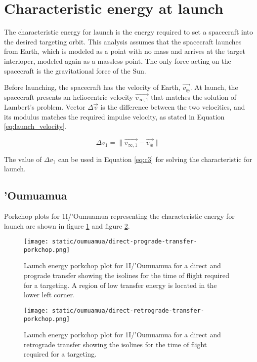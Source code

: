 \section{Characteristic energy at launch}

The characteristic energy for launch is the energy required to set a spacecraft
into the desired targeting orbit. This analysis assumes that the spacecraft
launches from Earth, which is modeled as a point with no mass and arrives at the
target interloper, modeled again as a massless point. The only force acting on
the spacecraft is the gravitational force of the Sun.

Before launching, the spacecraft has the velocity of Earth, $\vec{v_{\oplus}}$.
At launch, the spacecraft presents an heliocentric velocity $\vec{v_{\infty
,1}}$ that matches the solution of Lambert's problem. Vector $\Delta{\vec{v}}$
is the difference between the two velocities, and its modulus matches the
required impulse velocity, as stated in Equation \ref{eq:launch_velocity}.

\begin{equation}
    \Delta v_1 = \|\vec{v_{\infty ,1}} - \vec{v_{\oplus}}\|
    \label{eq:launch_velocity}
\end{equation}

The value of $\Delta v_1$ can be used in Equation \ref{eq:c3} for solving the
characteristic for launch.

\subsection{'Oumuamua}

Porkchop plots for 1I/'Oumuamua representing the characteristic energy for launch
are shown in figure \ref{fig:oumuamua-direct-prograde-transfer-porkchop} and
figure \ref{fig:oumuamua-direct-retrograde-transfer-porkchop}.

\begin{figure}[H]
  \centering
  \texttt{[image: static/oumuamua/direct-prograde-transfer-porkchop.png]}
        \caption[Direct and prograde launch energy porkchop for 'Oumuamua]{Launch energy porkchop plot for 1I/'Oumuamua for a direct and prograde
        transfer showing the isolines for
        the time of flight required for a targeting. A region of low transfer
        energy is located in the lower left corner.}
  \label{fig:oumuamua-direct-prograde-transfer-porkchop}
\end{figure}

\begin{figure}[H]
  \centering
  \texttt{[image: static/oumuamua/direct-retrograde-transfer-porkchop.png]}
        \caption[Direct and retrograde launch energy porkchop for
        'Oumuamua]{Launch energy porkchop plot for 1I/'Oumuamua for a direct and
        retrograde transfer showing the isolines for
        the time of flight required for a targeting.}
  \label{fig:oumuamua-direct-retrograde-transfer-porkchop}
\end{figure}

